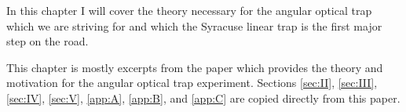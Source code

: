In this chapter I will cover the theory necessary for the angular optical trap
which we are striving for and which the Syracuse linear trap is the first major
step on the road.

This chapter is mostly excerpts from the paper which provides the theory and
motivation for the angular optical trap experiment.\cite{Perreca:2014}
Sections \ref{sec:II}, \ref{sec:III}, \ref{sec:IV}, \ref{sec:V}, \ref{app:A},
\ref{app:B}, and \ref{app:C} are copied directly from this paper.











